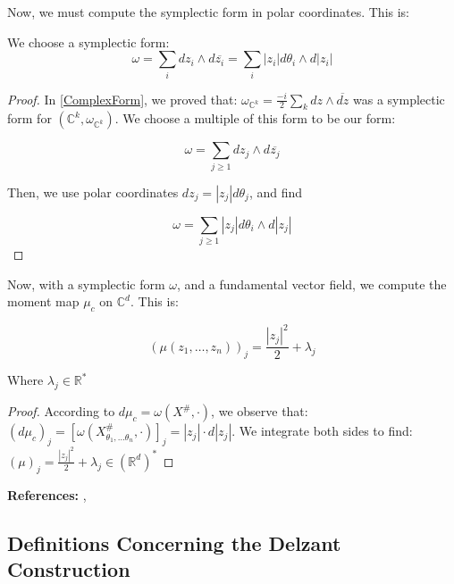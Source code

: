 Now, we must compute the symplectic form in polar coordinates. This is:

\begin{lemma}
We choose a symplectic form:
$$\omega = \sum_{i} dz_{i} \wedge d\overline{z_{i}} = \sum_{i} |z_i| d \theta_{i} \wedge d|z_{i}|$$
\end{lemma}

\begin{proof}
In \ref{ComplexForm}, we proved that: $\omega_{\mathbb{C}^{k}} = \frac{-i}{2} \sum_{k} dz \wedge \overline{dz}$ was a symplectic form for $(\mathbb{C}^{k}, \omega_{\mathbb{C}^{k}})$. We choose a multiple of this form to be our form:

$$\omega = \sum_{j \geq 1} dz_{j} \wedge d\overline{z_{j}} $$

\noindent Then, we use polar coordinates $dz_{j} = |z_{j}| d \theta_{j}$, and find

$$\omega = \sum_{j \geq 1} |z_j| d \theta_{i} \wedge d|z_{j}|$$
\end{proof}

Now, with a symplectic form $\omega$, and a fundamental vector field, we compute the moment map $\mu_{c}$ on $\mathbb{C}^{d}$. This is:

\begin{lemma}
\label{ComplexMomentMap}
\begin{equation}
\left (\mu (z_{1}, \dots, z_{n}) \right)_{j} = \frac{|z_{j}|^2}{2} + \lambda_{j}
\end{equation}

\noindent Where $\lambda_{j} \in \mathbb{R}^{*}$
\end{lemma}

\begin{proof}
According to $d \mu_{c} = \omega(X^{\#}, \cdot)$, we observe that: 
$\left (d \mu_{c} \right)_{j} = \left[ \omega(X^{\#}_{\theta_{1}, \dots \theta_{n}}, \cdot) \right]_{j} = |z_{j}| \cdot d|z_{j}|$. We integrate both sides to find: $\left (\mu \right )_{j} = \frac{|z_{j}|^2}{2} + \lambda_{j} \in (\mathbb{R}^{d})^{*}$
\end{proof}

\noindent \textbf{References:} \textcite{Guillemin1994} \textcite{Terek2020}, \textcite{Silva2001}

\subsection{Definitions Concerning the Delzant Construction}

